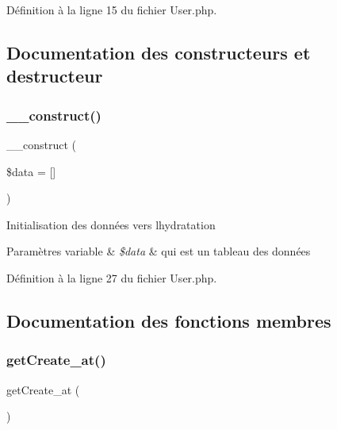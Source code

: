 Définition à la ligne 15 du fichier User.\+php.



\subsection{Documentation des constructeurs et destructeur}
\mbox{\label{class_src_1_1_entity_1_1_user_ab3129f1d71e9f51353de9d551ea381d7}} 
\subsubsection{\texorpdfstring{\+\_\+\+\_\+construct()}{\_\_construct()}}
{\footnotesize\ttfamily \+\_\+\+\_\+construct (\begin{DoxyParamCaption}\item[{}]{\$data = {\ttfamily \mbox{[}\mbox{]}} }\end{DoxyParamCaption})}

Initialisation des données vers l\textquotesingle{}hydratation 
\begin{DoxyParams}[1]{Paramètres}
variable & {\em \$data} & qui est un tableau des données \\
\hline
\end{DoxyParams}


Définition à la ligne 27 du fichier User.\+php.



\subsection{Documentation des fonctions membres}
\mbox{\label{class_src_1_1_entity_1_1_user_ae5e6c0bedcef3f514100c20ee92c901a}} 
\subsubsection{\texorpdfstring{get\+Create\+\_\+at()}{getCreate\_at()}}
{\footnotesize\ttfamily get\+Create\+\_\+at (\begin{DoxyParamCaption}{ }\end{DoxyParamCaption})}



